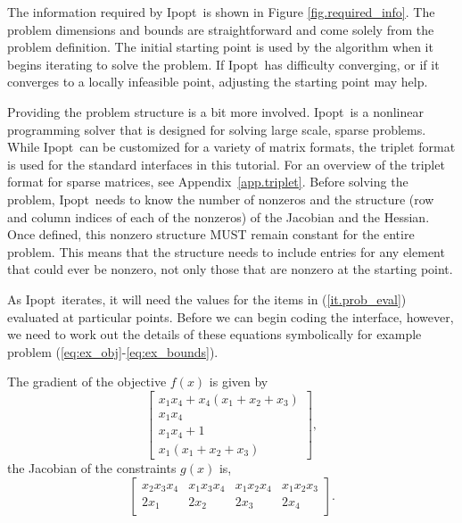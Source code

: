 \documentclass[letter,10pt]{article}
\newcommand{\Ipopt}{{\sc Ipopt}}
\begin{document}
The information required by \Ipopt\ is shown in Figure
\ref{fig.required_info}. The problem dimensions and bounds are
straightforward and come solely from the problem definition. The
initial starting point is used by the algorithm when it begins
iterating to solve the problem. If \Ipopt\ has difficulty converging, or
if it converges to a locally infeasible point, adjusting the starting
point may help.

Providing the problem structure is a bit more involved. \Ipopt\ is a
nonlinear programming solver that is designed for solving large scale,
sparse problems. While \Ipopt\ can be customized for a variety of matrix
formats, the triplet format is used for the standard interfaces in this
tutorial. For an overview of the triplet format for sparse matrices,
see Appendix~\ref{app.triplet}. Before solving the problem, \Ipopt\
needs to know the number of nonzeros and the structure (row and column
indices of each of the nonzeros) of the Jacobian and the Hessian. Once
defined, this nonzero structure MUST remain constant for the entire
problem. This means that the structure needs to include entries for
any element that could ever be nonzero, not only those that are
nonzero at the starting point.

As \Ipopt\ iterates, it will need the values for the items in
(\ref{it.prob_eval}) evaluated at particular points. Before we can
begin coding the interface, however, we need to work out the details
of these equations symbolically for example problem
(\ref{eq:ex_obj}-\ref{eq:ex_bounds}).

The gradient of the objective $f(x)$ is given by
\begin{equation}
\left[
\begin{array}{c}
x_1 x_4 + x_4 (x_1 + x_2 + x_3) \\
x_1 x_4 \\
x_1 x_4 + 1 \\
x_1 (x_1 + x_2 + x_3)
\end{array}
\right],
\end{equation}
the Jacobian of 
the constraints $g(x)$ is,
\begin{equation}
\left[
\begin{array}{cccc}
x_2 x_3 x_4     & x_1 x_3 x_4   & x_1 x_2 x_4   & x_1 x_2 x_3   \\
2 x_1           & 2 x_2         & 2 x_3         & 2 x_4
\end{array}
\right].
\end{equation}
\end{document}
